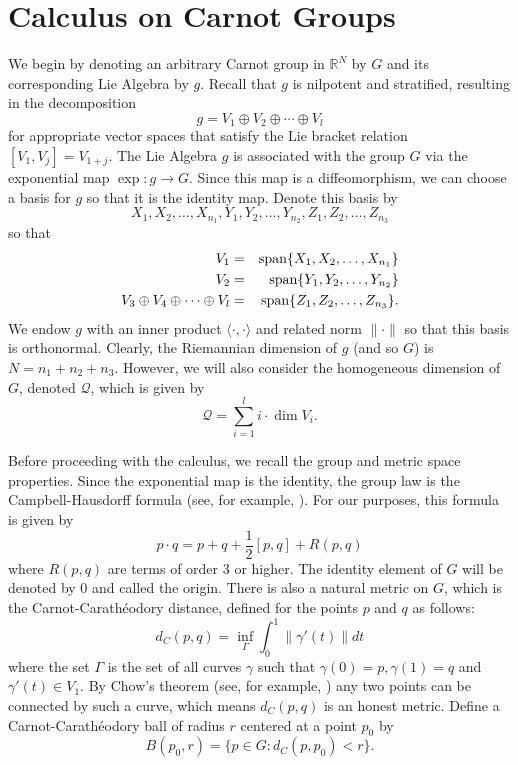 \documentclass[12pt]{amsart}
\theoremstyle{definition}
\theoremstyle{remark}
\numberwithin{equation}{section}
\begin{document}
\section{Calculus on Carnot Groups}
We begin by denoting an arbitrary Carnot group in $\mathbb{R}^N$ by $G$ and its
corresponding Lie Algebra by $g$.   Recall that $g$ is nilpotent and
stratified, resulting in the decomposition $$g= V_1 \oplus V_2 \oplus
\cdots \oplus V_l$$ for appropriate vector spaces that satisfy the Lie
bracket relation $[V_1,V_j]=V_{1+j}.$ The Lie Algebra $g$ is associated
with the group $G$ via the exponential map $\exp: g \to G.$ Since
this
map is a diffeomorphism, we can choose a basis for $g$ so that it is
the identity map.  Denote this basis by $$X_1,X_2,\ldots ,
X_{n_1},Y_1,Y_2,\ldots ,Y_{n_2},Z_1,Z_2, \ldots , Z_{n_3}$$ so that
\begin{eqnarray*} 
V_1 & = & \textmd{span}\{X_1,X_2,\ldots ,X_{n_1}\} \\
V_2 & = & \textmd{span}\{Y_1,Y_2,\ldots ,Y_{n_2}\} \\
V_3 \oplus V_4 \oplus \cdots \oplus V_l & = &  
\textmd{span}\{Z_1,Z_2,\ldots ,Z_{n_3}\}.
\end{eqnarray*} 
We endow $g$ with an inner product ${\ensuremath{\langle {\cdot} , {\cdot} \rangle}}$
 and related norm $\|\cdot\|$ so that this basis is orthonormal. 
 Clearly, the Riemannian dimension of $g$ (and so $G$) is $N
= n_1+n_2+n_3$. 
However, we will also consider the homogeneous dimension of $G$, denoted $\mathcal{Q}$,
which is given by $$\mathcal{Q}=\sum_{i=1}^l i \cdot \dim V_i.$$

Before proceeding with the calculus, we recall the group and metric space properties. Since
the exponential map is the identity, the group law is the
Campbell-Hausdorff formula (see, for example, \cite{BO:LAG}). For our
purposes, this formula is given by 
\begin{equation}\label{CCH}
p \cdot q =
p+q+\frac{1}{2}[p,q]+R(p,q)
\end{equation} 
where $R(p,q)$ are terms of order $3$ or
higher. The identity element of $G$ will be denoted by $0$ and called the
origin. There is also a natural metric on $G$, which is
the Carnot-Carath\'{e}odory distance, defined for the points $p$ and $q$
as follows: 
 \begin{equation*}
d_C(p,q)= \inf_{\Gamma} \int_{0}^{1} \| \gamma '(t) \| dt 
\end{equation*}
where the set $ \Gamma $
is the set of all  curves $ \gamma $ such that $ \gamma (0) = p,
 \gamma (1) = q $ and $\gamma '(t) \in V_1$.  
 By Chow's theorem (see, for example,
\cite{BR:SRG}) any two points
 can be connected by such a curve, which means $ d_C(p,q) $ is an honest
metric.  Define a Carnot-Carath\'{e}odory ball of radius $r$ centered at a
point $p_0$ by $$B(p_0,r)=\{p\in G : d_C(p,p_0) < r\}.$$
 
\end{document}
